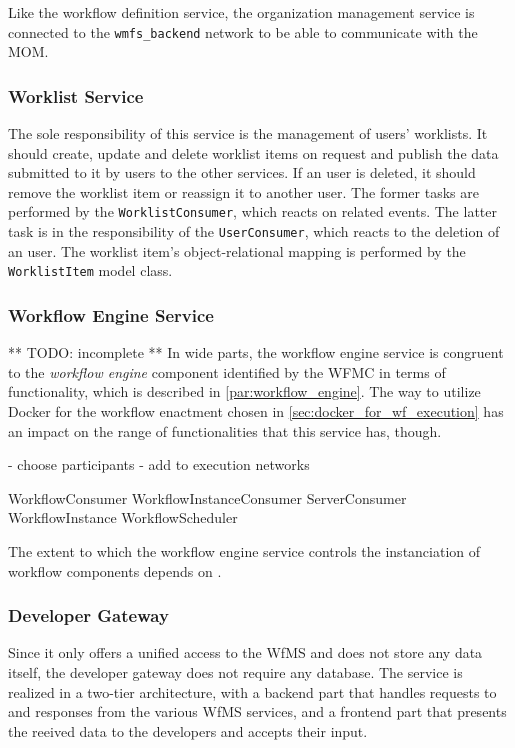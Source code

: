     Like the workflow definition service, the organization management service is connected to the \texttt{wmfs\_backend} network to be able to communicate with the \ac{MOM}.

  \subsubsection{Worklist Service} %
    \label{subs:worklist_service}
    The sole responsibility of this service is the management of users' worklists. It should create, update and delete worklist items on request and publish the data submitted to it by users to the other services. If an user is deleted, it should remove the worklist item or reassign it to another user. The former tasks are performed by the \texttt{WorklistConsumer}, which reacts on related events. The latter task is in the responsibility of the \texttt{UserConsumer}, which reacts to the deletion of an user. The worklist item's object-relational mapping is performed by the \texttt{WorklistItem} model class.

  \subsubsection{Workflow Engine Service} %
    \label{subs:workflow_engine_service}
    ** TODO: incomplete **
    In wide parts, the workflow engine service is congruent to the \emph{workflow engine} component identified by the \ac{WFMC} in terms of functionality, which is described in \ref{par:workflow_engine}. The way  to utilize Docker for the workflow enactment chosen in \ref{sec:docker_for_wf_execution} has an impact on the range of functionalities that this service has, though.

    - choose participants
    - add to execution networks

    WorkflowConsumer
    WorkflowInstanceConsumer
    ServerConsumer
    WorkflowInstance
    WorkflowScheduler


    The extent to which the workflow engine service controls the instanciation of workflow components depends on .

  \subsubsection{Developer Gateway} %
    \label{subs:developer_gateway}
    Since it only offers a unified access to the \ac{WfMS} and does not store any data itself, the developer gateway does not require any database. The service is realized in a two-tier architecture, with a backend part that handles requests to and responses from the various \ac{WfMS} services, and a frontend part that presents the reeived data to the developers and accepts their input.

